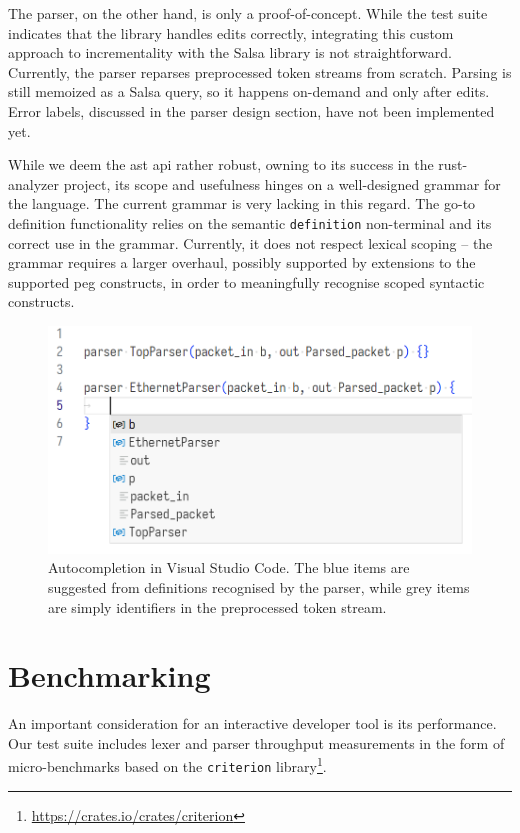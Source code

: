 The parser, on the other hand, is only a proof-of-concept. While the test suite
indicates that the library handles edits correctly, integrating this custom
approach to incrementality with the Salsa library is not straightforward.
Currently, the parser reparses preprocessed token streams from scratch. Parsing
is still memoized as a Salsa query, so it happens on-demand and only after
edits. Error labels, discussed in the parser design section, have not been
implemented yet.

While we deem the \acrlong{ast} \acrshort{api} rather robust, owning to its
success in the rust-analyzer project, its scope and usefulness hinges on a
well-designed grammar for the \pfs language. The current grammar is very lacking
in this regard. The go-to definition functionality relies on the semantic
\texttt{definition} non-terminal and its correct use in the grammar. Currently,
it does not respect lexical scoping -- the grammar requires a larger overhaul,
possibly supported by extensions to the supported \acrshort{peg} constructs, in
order to meaningfully recognise scoped syntactic constructs.

\begin{figure}[h]
	\centering
	\includegraphics[width=\textwidth]{resources/p4analyzer-autocompletion.png}
	\caption{Autocompletion in Visual Studio Code. The blue items are suggested
	from definitions recognised by the parser, while grey items are simply
	identifiers in the preprocessed token stream.}
	\label{fig:autocompletion}
\end{figure}

\section{Benchmarking}

An important consideration for an interactive developer tool is its performance.
Our test suite includes lexer and parser throughput measurements in the form of
micro-benchmarks based on the \texttt{criterion}
library\footnote{\url{https://crates.io/crates/criterion}}.

